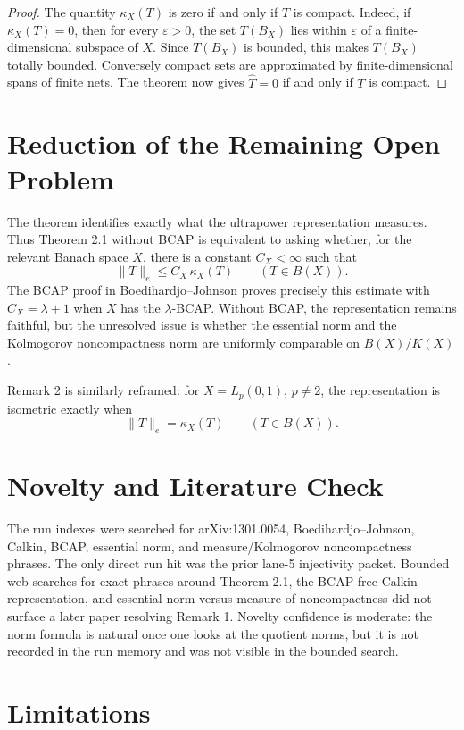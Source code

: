 \documentclass[11pt]{article}
\newcommand{\eps}{\varepsilon}
\begin{document}
\begin{proof}
The quantity \(\kappa_X(T)\) is zero if and only if \(T\) is compact.  Indeed,
if \(\kappa_X(T)=0\), then for every \(\eps>0\), the set \(T(B_X)\) lies within
\(\eps\) of a finite-dimensional subspace of \(X\).  Since \(T(B_X)\) is
bounded, this makes \(T(B_X)\) totally bounded.  Conversely compact sets are
approximated by finite-dimensional spans of finite nets.  The theorem now
gives \(\widehat T=0\) if and only if \(T\) is compact.
\end{proof}

\section*{Reduction of the Remaining Open Problem}

The theorem identifies exactly what the ultrapower representation measures.
Thus Theorem 2.1 without BCAP is equivalent to asking whether, for the relevant
Banach space \(X\), there is a constant \(C_X<\infty\) such that
\[
  \|T\|_e\le C_X\,\kappa_X(T)
  \qquad (T\in B(X)).
\]
The BCAP proof in Boedihardjo--Johnson proves precisely this estimate with
\(C_X=\lambda+1\) when \(X\) has the \(\lambda\)-BCAP.  Without BCAP, the
representation remains faithful, but the unresolved issue is whether the
essential norm and the Kolmogorov noncompactness norm are uniformly comparable
on \(B(X)/K(X)\).

Remark 2 is similarly reframed: for \(X=L_p(0,1)\), \(p\ne2\), the
representation is isometric exactly when
\[
  \|T\|_e=\kappa_X(T)
  \qquad (T\in B(X)).
\]

\section*{Novelty and Literature Check}

The run indexes were searched for arXiv:1301.0054, Boedihardjo--Johnson,
Calkin, BCAP, essential norm, and measure/Kolmogorov noncompactness phrases.
The only direct run hit was the prior lane-5 injectivity packet.  Bounded web
searches for exact phrases around Theorem 2.1, the BCAP-free Calkin
representation, and essential norm versus measure of noncompactness did not
surface a later paper resolving Remark 1.  Novelty confidence is moderate: the
norm formula is natural once one looks at the quotient norms, but it is not
recorded in the run memory and was not visible in the bounded search.

\section*{Limitations}
\end{document}
